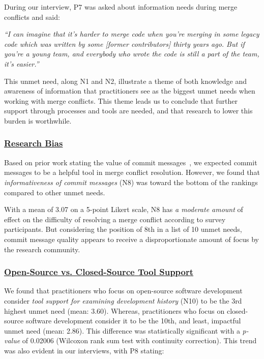During our interview, P7 was asked about information needs during merge conflicts and said:
\begin{displayquote}
\textit{``I can imagine that it's harder to merge code when you're merging in some legacy code which was written by some [former contributors] thirty years ago. But if you're a young team, and everybody who wrote the code is still a part of the team, it's easier.''}
\end{displayquote}

This unmet need, along N1 and N2, illustrate a theme of both knowledge and awareness of information that practitioners see as the biggest unmet needs when working with merge conflicts.
This theme leads us to conclude that further support through processes and tools are needed, and that research to lower this burden is worthwhile.

\subsubsection{\underline{Research Bias}}
Based on prior work stating the value of commit messages~\cite{yamauchi2014clustering}\cite{hindle2009automatic}\cite{cortes2014automatically}\cite{hattori2008nature}, we expected commit messages to be a helpful tool in merge conflict resolution.
However, we found that \textit{informativeness of commit messages} (N8) was toward the bottom of the rankings compared to other unmet needs.

With a mean of 3.07 on a 5-point Likert scale, N8 has \textit{a moderate amount} of effect on the difficulty of resolving a merge conflict according to survey participants.
But considering the position of 8th in a list of 10 unmet needs, commit message quality appears to receive a disproportionate amount of focus by the research community.



\subsubsection{\underline{Open-Source vs. Closed-Source Tool Support}}
\label{oss_vs_closed_tool_support} 

We found that practitioners who focus on open-source software development consider \textit{tool support for examining development history} (N10) to be the 3rd highest unmet need (mean: 3.60).
Whereas, practitioners who focus on closed-source software development consider it to be the 10th, and least, impactful unmet need (mean: 2.86).
This difference was statistically significant with a \textit{p-value} of 0.02006 (Wilcoxon rank sum test with continuity correction).
This trend was also evident in our interviews, with P8 stating:

